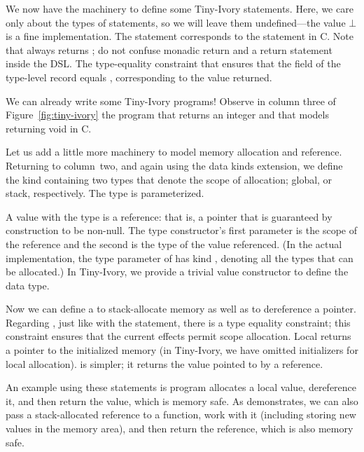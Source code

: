 We now have the machinery to define some Tiny-Ivory statements.  Here, we care
only about the types of statements, so we will leave them undefined---the value
$\bot$ is a fine implementation.  The statement  corresponds to the
 statement in C.  Note that  always returns \cd{()}; do not
confuse monadic return and a return statement inside the DSL.  The type-equality
constraint that ensures that the  field of the type-level record equals
, corresponding to the value returned.

We can already write some Tiny-Ivory programs!  Observe in column three of
Figure~\ref{fig:tiny-ivory} the program  that returns an integer and
 that models returning void in C.

Let us add a little more machinery to model memory allocation and reference.
Returning to column~two, and again using the data kinds extension, we define the
kind  containing two types that denote the scope of allocation;
global, or stack, respectively.  The  type is parameterized.

A value with the type  is a reference: that is, a pointer that is
guaranteed by construction to be non-null.  The type constructor's first
parameter is the scope of the reference and the second is the type of the value
referenced.  (In the actual implementation, the type parameter of  has
kind , denoting all the types that can be allocated.)  In Tiny-Ivory,
we provide a trivial value constructor to define the data type.

Now we can define a  to stack-allocate memory as well as  to
dereference a pointer.  Regarding , just like with the 
statement, there is a type equality constraint; this constraint ensures that the
current effects permit scope allocation.  Local returns a pointer to the
initialized memory (in Tiny-Ivory, we have omitted initializers for local
allocation).   is simpler; it returns the value pointed to by a
reference.

An example using these statements is program  allocates a local value,
dereference it, and then return the value, which is memory safe.  As 
demonstrates, we can also pass a stack-allocated reference to a function, work
with it (including storing new values in the memory area), and then return the
reference, which is also memory safe.


